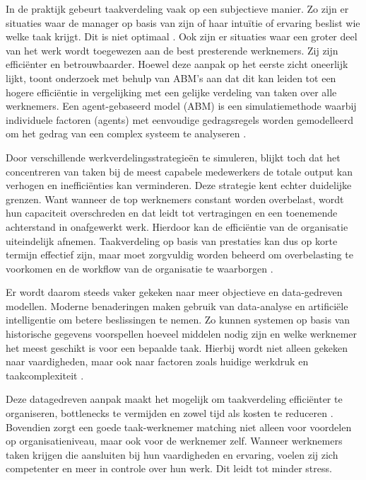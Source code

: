 In de praktijk gebeurt taakverdeling vaak op een subjectieve manier. Zo zijn er situaties waar de manager op basis van zijn of haar intuïtie of ervaring beslist wie welke taak krijgt. Dit is niet optimaal \autocite{Pratama_2023}. Ook zijn er situaties waar een groter deel van het werk wordt toegewezen aan de best presterende werknemers. Zij zijn efficiënter en betrouwbaarder. Hoewel deze aanpak op het eerste zicht oneerlijk lijkt, toont onderzoek met behulp van ABM's aan dat dit kan leiden tot een hogere efficiëntie in vergelijking met een gelijke verdeling van taken over alle werknemers. Een agent-gebaseerd model (ABM) is een simulatiemethode waarbij individuele factoren (agents) met eenvoudige gedragsregels worden gemodelleerd om het gedrag van een complex systeem te analyseren \autocite{Sobkowicz_2016}.

Door verschillende werkverdelingsstrategieën te simuleren, blijkt toch dat het concentreren van taken bij de meest capabele medewerkers de totale output kan verhogen en inefficiënties kan verminderen. Deze strategie kent echter duidelijke grenzen. Want wanneer de top werknemers constant worden overbelast, wordt hun capaciteit overschreden en dat leidt tot vertragingen en een toenemende achterstand in onafgewerkt werk. Hierdoor kan de efficiëntie van de organisatie uiteindelijk afnemen. Taakverdeling op basis van prestaties kan dus op korte termijn effectief zijn, maar moet zorgvuldig worden beheerd om overbelasting te voorkomen en de workflow van de organisatie te waarborgen \autocite{Sobkowicz_2016}.

\vspace{1em}Er wordt daarom steeds vaker gekeken naar meer objectieve en data-gedreven modellen. Moderne benaderingen maken gebruik van data-analyse en artificiële intelligentie om betere beslissingen te nemen. Zo kunnen systemen op basis van historische gegevens voorspellen hoeveel middelen nodig zijn en welke werknemer het meest geschikt is voor een bepaalde taak. Hierbij wordt niet alleen gekeken naar vaardigheden, maar ook naar factoren zoals huidige werkdruk en taakcomplexiteit \autocite{Pratama_2023}.

Deze datagedreven aanpak maakt het mogelijk om taakverdeling efficiënter te organiseren, bottlenecks te vermijden en zowel tijd als kosten te reduceren \autocite{Pratama_2023}. Bovendien zorgt een goede taak-werknemer matching niet alleen voor voordelen op organisatieniveau, maar ook voor de werknemer zelf. Wanneer werknemers taken krijgen die aansluiten bij hun vaardigheden en ervaring, voelen zij zich competenter en meer in controle over hun werk. Dit leidt tot minder stress.

